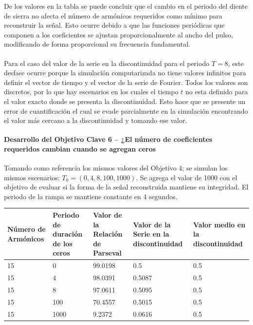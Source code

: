 \documentclass[7pt]{article}
\begin{document}
    De los valores en la tabla se puede concluir que el cambio en el periodo del diente de 
    sierra no afecta el número de armónicos requeridos como mínimo para reconstruir la 
    señal. Esto ocurre debido a que las funciones periódicas que componen a los coeficientes 
    se ajustan proporcionalmente al ancho del pulso, modificando de forma proporcional su 
    frecuencia fundamental.\\
    \\
    Para el caso del valor de la serie en la discontinuidad para el periodo $T=8$, este desfase 
    ocurre porque la simulación computarizada no tiene valores infinitos para definir el vector 
    de tiempo y el vector de la serie de Fourier. Todos los valores son discretos, por lo que hay 
    escenarios en los cuales el tiempo $t$ no esta definido para el valor exacto donde se 
    presenta la discontinuidad. Esto hace que se presente un error de cuantificación el cual se 
    evade parcialmente en la simulación encontrando el valor más cercano a la discontinuidad 
    y tomando ese valor.\\
    \\
    \textbf{Desarrollo del Objetivo Clave 6 -- ¿El número de coeficientes requeridos cambian cuando se agregan ceros}
    \\\\
    Tomando como referencia los mismos valores del Objetivo 4; se simulan los mismos 
    escenarios: $T_0=(0,4,8,100,1000)$. Se agrega el valor de 1000 con el objetivo de evaluar si la 
    forma de la señal reconstruida mantiene su integridad. El periodo de la rampa se mantiene 
    constante en 4 segundos.

    \begin{table}[H]
        \begin{center}
            \begin{tabular}{| m{2.5cm} | m{2.5cm} | m{2.5cm} | m{2.5cm} | m{2.5cm} |}
                \hline
                \textbf{Número de Armónicos} & \textbf{Periodo de duración de los ceros} & \textbf{Valor de la Relación de Parseval} & \textbf{Valor de la Serie en la discontinuidad} & \textbf{Valor medio en la discontinuidad} \\ \hline
                15 & 0 & 99.0198 & 0.5 & 0.5 \\ \hline
                15 & 4 & 98.0391 & 0.5087 & 0.5 \\ \hline
                15 & 8 & 97.0611 & 0.5095 & 0.5 \\ \hline
                15 & 100 & 70.4557 & 0.5015 & 0.5 \\ \hline
                15 & 1000 & 9.2372 & 0.0616 & 0.5 \\ \hline
            \end{tabular}
        \end{center}
    \end{table}
\end{document}
